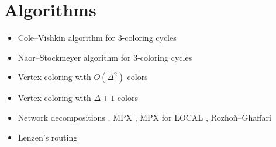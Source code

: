 \documentclass[a4paper,11pt]{article}
\begin{document}
\section{Algorithms}
\begin{itemize}
    \item Cole--Vishkin algorithm for 3-coloring cycles \cite{cole-vishkin-1986-deterministic-coin-tossing-with,goldberg-plotkin-shannon-1988-parallel-symmetry}
    \item Naor--Stockmeyer algorithm for 3-coloring cycles \cite{naor-stockmeyer-1995-what-can-be-computed-locally}
    \item Vertex coloring with $O(\Delta^2)$ colors \cite{linial-1992-locality-in-distributed-graph-algorithms}
    \item Vertex coloring with $\Delta+1$ colors \cite{maus-tonoyan-2022-linial-for-lists,barenboim-elkin-goldenberg-2022-locally-iterative}
    \item Network decompositions \cite{awerbuch-goldberg-etal-1989-network-decomposition-and}, MPX \cite{miller-peng-xu-2013-parallel-graph-decompositions-using}, MPX for LOCAL \cite{elkin-neiman-2022-distributed-strong-diameter-network}, Rozhoň--Ghaffari \cite{rozhon-ghaffari-2020-polylogarithmic-time-deterministic}
    \item Lenzen's routing \cite{lenzen-2013-optimal-deterministic-routing-and-sorting}
\end{itemize}
\end{document}
